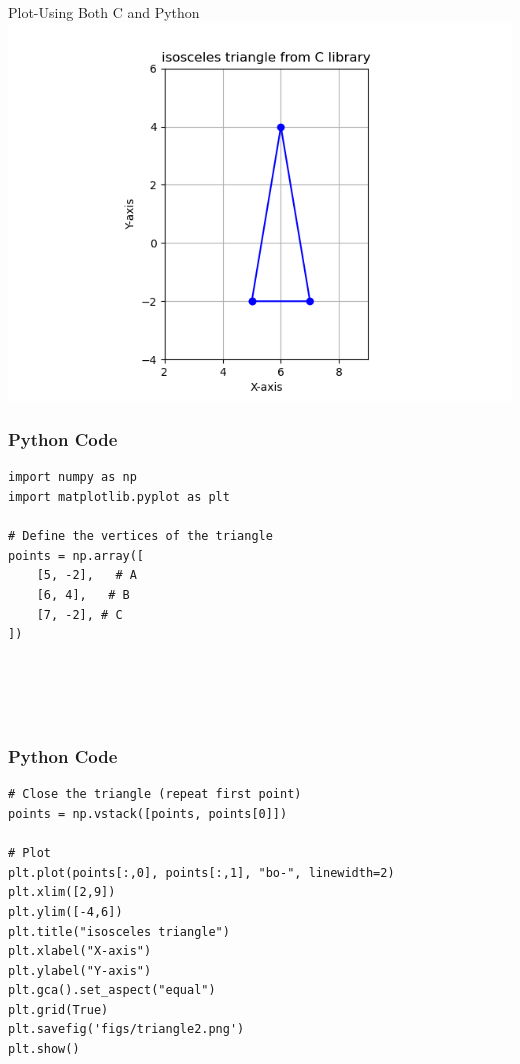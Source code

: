 \documentclass{beamer}
\begin{document}
\begin{frame}{Plot-Using Both C and Python}
    \centering
    \includegraphics[width=\columnwidth, height=0.8\textheight, keepaspectratio]{figs/triangle.png}     
\end{frame}

\begin{frame}[fragile]
    \frametitle{Python Code}
    \begin{lstlisting}
import numpy as np
import matplotlib.pyplot as plt

# Define the vertices of the triangle
points = np.array([
    [5, -2],   # A
    [6, 4],   # B
    [7, -2], # C
])





\end{lstlisting}
\end{frame}

\begin{frame}[fragile]
    \frametitle{Python Code }
    \begin{lstlisting}
# Close the triangle (repeat first point)
points = np.vstack([points, points[0]])

# Plot
plt.plot(points[:,0], points[:,1], "bo-", linewidth=2)
plt.xlim([2,9])
plt.ylim([-4,6])
plt.title("isosceles triangle")
plt.xlabel("X-axis")
plt.ylabel("Y-axis")
plt.gca().set_aspect("equal")
plt.grid(True)
plt.savefig('figs/triangle2.png')
plt.show()


\end{lstlisting}
\end{frame}
\end{document}
